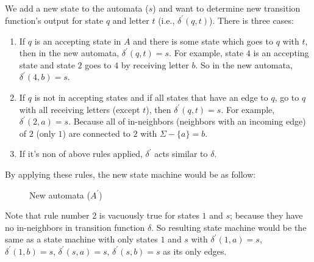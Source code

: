 \documentclass[11pt]{article}
\begin{document}
\subsection{}
We add a new state to the automata (\(s\)) and want to determine new transition function's output for state \(q\) and letter \(t\) (i.e., \(\delta^\prime(q, t)\)).
There is three cases:
\begin{enumerate}
    \item If \(q\) is an accepting state in \(A\) and there is some state which goes to \(q\) with \(t\), then in the new automata, \(\delta^\prime(q, t) = s\).
    For example, state \(4\) is an accepting state and state \(2\) goes to \(4\) by receiving letter \(b\).
    So in the new automata, \(\delta^\prime(4, b) = s\).

    \item If \(q\) is not in accepting states and if all states that have an edge to \(q\), go to \(q\) with all receiving letters (except \(t\)), then \(\delta^\prime(q, t) = s\).
    For example, \(\delta^\prime(2, a) = s\). Because all of  in-neighbors (neighbors with an incoming edge) of \(2\) (only \(1\)) are connected to \(2\) with \(\Sigma - \{a\} = b\).

    \item If it's non of above rules applied, \(\delta^\prime\) acts similar to \(\delta\).
\end{enumerate}
By applying these rules, the new state machine would be as follow:

\begin{figure}[H]
    \centering
    
    \caption{New automata (\(A^\prime\))}
    \label{fig:3.1dfa}
\end{figure}

Note that rule number 2 is vacuously true for states \(1\) and \(s\); because they have no in-neighbors in transition function \( \delta \).
So resulting state machine would be the same as a state machine with only states \(1\) and \(s\) with \(\delta^\prime(1, a) = s\), \(\delta^\prime(1, b) = s\), \(\delta^\prime(s, a) = s\), \(\delta^\prime(s, b) = s\) as its only edges.
\end{document}

